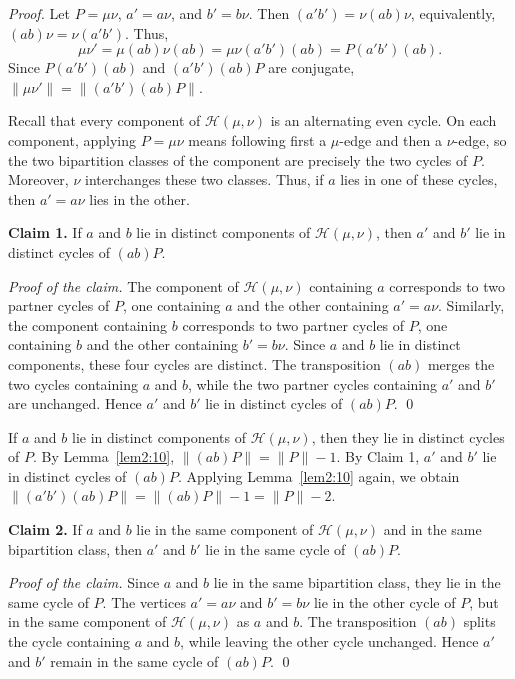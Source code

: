 \documentclass[10pt,a4paper]{amsart}
\begin{document}
\begin{proof}
Let $P=\mu\nu$, $a'=a\nu$, and $b'=b\nu$.  Then
$(a'b')=\nu(ab)\nu$, equivalently, $(ab)\nu=\nu (a'b')$. Thus,
$$\mu\nu'=\mu(ab)\nu(ab)=\mu\nu (a'b')(ab)=P(a'b')(ab).$$
Since $P(a'b')(ab)$ and $(a'b')(ab)P$ are conjugate,
$\lVert\mu\nu'\rVert=\lVert (a'b')(ab)P\rVert$.

Recall that every component of $\mathcal H(\mu,\nu)$ is an alternating even cycle.
On each component, applying $P=\mu\nu$ means following first a $\mu$-edge and then a $\nu$-edge, so the two
bipartition classes of the component are precisely the two cycles of
$P$. Moreover, $\nu$ interchanges these two classes. Thus, if $a$ lies
in one of these cycles, then $a'=a\nu$ lies in the other.

\medskip
\noindent\textbf{Claim 1.}
If $a$ and $b$ lie in distinct components of
$\mathcal H(\mu,\nu)$, then $a'$ and $b'$ lie in distinct cycles of
$(ab)P$.
\smallskip

\noindent\emph{Proof of the claim.}
The component of $\mathcal H(\mu,\nu)$ containing $a$ corresponds to
two partner cycles of $P$, one containing $a$ and the other containing
$a'=a\nu$. Similarly, the component containing $b$ corresponds to two
partner cycles of $P$, one containing $b$ and the other containing
$b'=b\nu$. Since $a$ and $b$ lie in distinct components, these four cycles are distinct. The transposition $(ab)$ merges the two
cycles containing $a$ and $b$, while the two partner cycles containing
$a'$ and $b'$ are unchanged. Hence $a'$ and $b'$ lie in distinct cycles of $(ab)P$. \qed


If $a$ and $b$ lie in distinct components of
$\mathcal H(\mu,\nu)$, then they lie in distinct cycles of $P$. By
Lemma~\ref{lem2:10},
$\lVert(ab)P\rVert=\lVert P\rVert-1$.
By Claim 1, $a'$ and $b'$ lie in distinct cycles of $(ab)P$. Applying
Lemma~\ref{lem2:10} again, we obtain
$\lVert (a'b')(ab)P\rVert=\lVert(ab)P\rVert-1=\lVert P\rVert-2$.

\medskip
\noindent\textbf{Claim 2.}
If $a$ and $b$ lie in the same component of $\mathcal H(\mu,\nu)$ and in the same bipartition class, then $a'$ and $b'$ lie in the same cycle of $(ab)P$.

\smallskip
\noindent\emph{Proof of the claim.}
Since $a$ and $b$ lie in the same bipartition class, they lie in the same cycle of $P$. The vertices $a'=a\nu$ and $b'=b\nu$ lie in the other cycle of $P$, but in the same component of $\mathcal H(\mu,\nu)$ as $a$ and $b$. The transposition $(ab)$ splits the cycle containing $a$ and $b$, while leaving the other cycle unchanged. Hence $a'$ and $b'$ remain in the same cycle of $(ab)P$. \qed


\end{proof}
\end{document}
